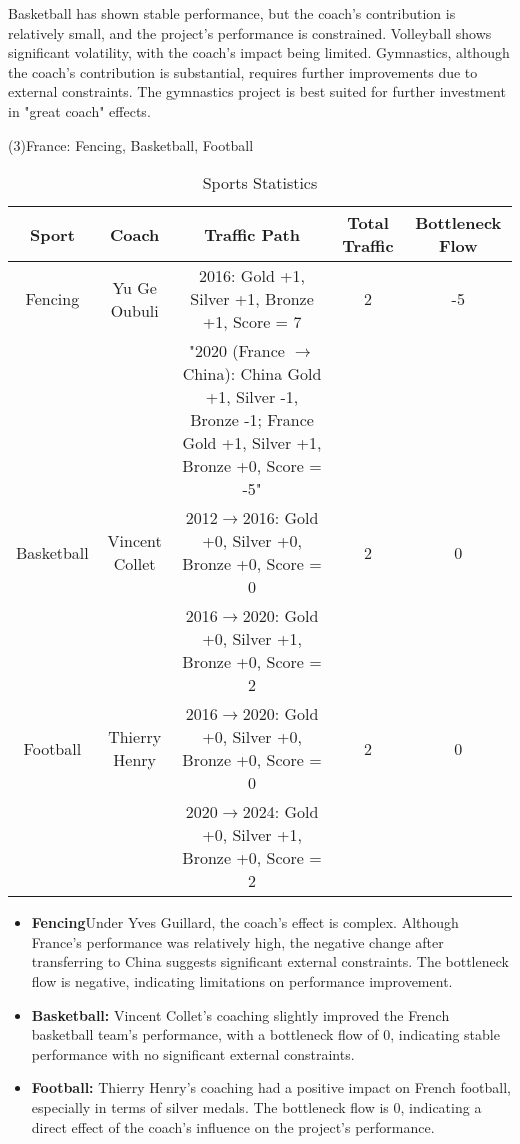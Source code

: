 \documentclass{mcmthesis}
\begin{document}
    Basketball has shown stable performance, but the coach’s contribution is relatively small, and the project’s performance is constrained. Volleyball shows significant volatility, with the coach’s impact being limited. Gymnastics, although the coach’s contribution is substantial, requires further improvements due to external constraints. The gymnastics project is best suited for further investment in "great coach" effects.

    (3)France: Fencing, Basketball, Football
    \begin{table}[ht]
        \centering
        \begin{tabular}{|c|c|c|c|c|}
        \hline
        Sport & Coach & Traffic Path & Total Traffic & Bottleneck Flow \\
        \hline
        Fencing & Yu Ge Oubuli & 2016: Gold +1, Silver +1, Bronze +1, Score = 7 & 2 & -5 \\
         & & "2020 (France $\to$ China): China Gold +1, Silver -1, Bronze -1; France Gold +1, Silver +1, Bronze +0, Score = -5" & & \\
        \hline
        Basketball & Vincent Collet & 2012$\to$2016: Gold +0, Silver +0, Bronze +0, Score = 0 & 2 & 0 \\
         & & 2016$\to$2020: Gold +0, Silver +1, Bronze +0, Score = 2 & & \\
        \hline
        Football & Thierry Henry & 2016$\to$2020: Gold +0, Silver +0, Bronze +0, Score = 0 & 2 & 0 \\
         & & 2020$\to$2024: Gold +0, Silver +1, Bronze +0, Score = 2 & & \\
        \hline
        \end{tabular}
        \caption{Sports Statistics}
    \end{table}

    \begin{itemize}
        \item {\bf Fencing}Under Yves Guillard, the coach's effect is complex. Although France's performance was relatively high, the negative change after transferring to China suggests significant external constraints. The bottleneck flow is negative, indicating limitations on performance improvement.
        \item {\bf Basketball: }Vincent Collet’s coaching slightly improved the French basketball team’s performance, with a bottleneck flow of 0, indicating stable performance with no significant external constraints.
        \item {\bf Football: } Thierry Henry’s coaching had a positive impact on French football, especially in terms of silver medals. The bottleneck flow is 0, indicating a direct effect of the coach’s influence on the project’s performance.
    \end{itemize}
\end{document}
